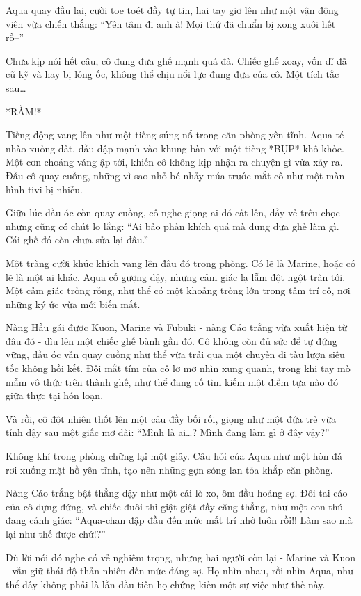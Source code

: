 \documentclass[../main.tex]{subfiles}
\begin{document}
Aqua quay đầu lại, cười toe toét đầy tự tin, hai tay giơ lên như một vận động viên vừa chiến thắng: ``Yên tâm đi anh à! Mọi thứ đã chuẩn bị xong xuôi hết rồ--''

Chưa kịp nói hết câu, cô đung đưa ghế mạnh quá đà. Chiếc ghế xoay, vốn dĩ đã cũ kỹ và hay bị lỏng ốc, không thể chịu nổi lực đung đưa của cô. Một tích tắc sau\dots

*RẦM!*

Tiếng động vang lên như một tiếng súng nổ trong căn phòng yên tĩnh. Aqua té nhào xuống đất, đầu đập mạnh vào khung bàn với một tiếng *BỤP* khô khốc. Một cơn choáng váng ập tới, khiến cô không kịp nhận ra chuyện gì vừa xảy ra. Đầu cô quay cuồng, những vì sao nhỏ bé nhảy múa trước mắt cô như một màn hình tivi bị nhiễu.

Giữa lúc đầu óc còn quay cuồng, cô nghe giọng ai đó cất lên, đầy vẻ trêu chọc nhưng cũng có chút lo lắng: ``Ai bảo phấn khích quá mà đung đưa ghế làm gì. Cái ghế đó còn chưa sửa lại đâu.''

Một tràng cười khúc khích vang lên đâu đó trong phòng. Có lẽ là Marine, hoặc có lẽ là một ai khác. Aqua cố gượng dậy, nhưng cảm giác lạ lẫm đột ngột tràn tới. Một cảm giác trống rỗng, như thể có một khoảng trống lớn trong tâm trí cô, nơi những ký ức vừa mới biến mất.

Nàng Hầu gái được Kuon, Marine và Fubuki - nàng Cáo trắng vừa xuất hiện từ đâu đó - dìu lên một chiếc ghế bành gần đó. Cô không còn đủ sức để tự đứng vững, đầu óc vẫn quay cuồng như thể vừa trải qua một chuyến đi tàu lượn siêu tốc không hồi kết. Đôi mắt tím của cô lơ mơ nhìn xung quanh, trong khi tay mò mẫm vô thức trên thành ghế, như thể đang cố tìm kiếm một điểm tựa nào đó giữa thực tại hỗn loạn.

Và rồi, cô đột nhiên thốt lên một câu đầy bối rối, giọng như một đứa trẻ vừa tỉnh dậy sau một giấc mơ dài: ``Mình là ai\dots? Mình đang làm gì ở đây vậy?''

Không khí trong phòng chững lại một giây. Câu hỏi của Aqua như một hòn đá rơi xuống mặt hồ yên tĩnh, tạo nên những gợn sóng lan tỏa khắp căn phòng.

Nàng Cáo trắng bật thẳng dậy như một cái lò xo, ôm đầu hoảng sợ. Đôi tai cáo của cô dựng đứng, và chiếc đuôi thì giật giật đầy căng thẳng, như một con thú đang cảnh giác: ``Aqua-chan đập đầu đến mức mất trí nhớ luôn rồi!! Làm sao mà lại như thế được chứ!?''

Dù lời nói đó nghe có vẻ nghiêm trọng, nhưng hai người còn lại - Marine và Kuon - vẫn giữ thái độ thản nhiên đến mức đáng sợ. Họ nhìn nhau, rồi nhìn Aqua, như thể đây không phải là lần đầu tiên họ chứng kiến một sự việc như thế này.
\end{document}
